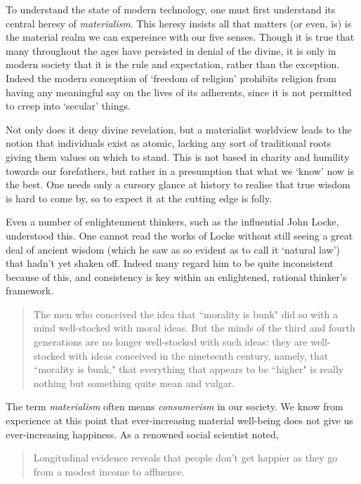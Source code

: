 \documentclass[letterpaper]{article}
\begin{document}
To understand the state of modern technology, one must first understand its central heresy of \textit{materialism}. This heresy insists all that matters (or even, is) is the material realm we can expereince with our five senses. Though it is true that many throughout the ages have persisted in denial of the divine, it is only in modern society that it is the rule and expectation, rather than the exception. Indeed the modern conception of `freedom of religion' prohibits religion from having any meaningful say on the lives of its adherents, since it is not permitted to creep into `secular' things.

Not only does it deny divine revelation, but a materialist worldview leads to the notion that individuals exist as atomic, lacking any sort of traditional roots giving them values on which to stand. This is not based in charity and humility towards our forefathers, but rather in a presumption that what we `know' now is the best. One needs only a cursory glance at history to realise that true wisdom is hard to come by, so to expect it at the cutting edge is folly.

Even a number of enlightenment thinkers, such as the influential John Locke, understood this. One cannot read the works of Locke without still seeing a great deal of ancient wisdom (which he saw as so evident as to call it `natural law') that hadn't yet shaken off. Indeed many regard him to be quite inconsistent because of this, and consistency is key within an enlightened, rational thinker's framework.

\begin{quote}
  The men who conceived the idea that ``morality is bunk" did so with a mind well-stocked with moral ideas. But the minds of the third and fourth generations are no longer well-stocked with such ideas: they are well-stocked with ideas conceived in the nineteenth century, namely, that ``morality is bunk," that everything that appears to be ``higher" is really nothing but something quite mean and vulgar.
\end{quote}

The term \textit{materialism} often means \textit{consumerism} in our society. We know from experience at this point that ever-increasing material well-being does not give us ever-increasing happiness. As a renowned social scientist noted,

\begin{quote}
  Longitudinal evidence reveals that people don't get happier as they go from a modest income to affluence.
\end{quote}
\end{document}
